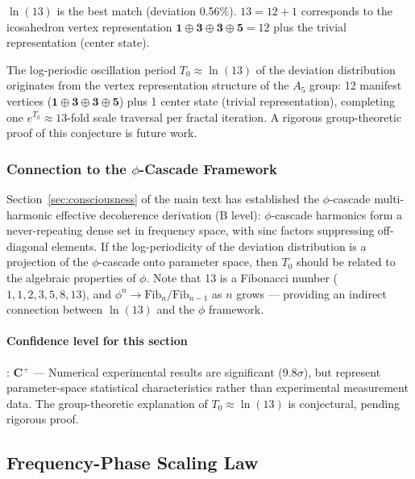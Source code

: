 $\ln(13)$ is the best match (deviation 0.56\%). $13 = 12 + 1$ corresponds to the icosahedron vertex representation $\mathbf{1}\oplus\mathbf{3}\oplus\mathbf{3}\oplus\mathbf{5} = 12$ plus the trivial representation (center state).

\begin{conjecture}
\label{conj:ln13_en}
The log-periodic oscillation period $T_0 \approx \ln(13)$ of the deviation distribution originates from the vertex representation structure of the $A_5$ group: 12 manifest vertices ($\mathbf{1}\oplus\mathbf{3}\oplus\mathbf{3}\oplus\mathbf{5}$) plus 1 center state (trivial representation), completing one $e^{T_0}\approx 13$-fold scale traversal per fractal iteration. A rigorous group-theoretic proof of this conjecture is future work.
\end{conjecture}

\subsubsection{Connection to the $\phi$-Cascade Framework}

Section~\ref{sec:consciousness} of the main text has established the $\phi$-cascade multi-harmonic effective decoherence derivation (B level): $\phi$-cascade harmonics form a never-repeating dense set in frequency space, with sinc factors suppressing off-diagonal elements. If the log-periodicity of the deviation distribution is a projection of the $\phi$-cascade onto parameter space, then $T_0$ should be related to the algebraic properties of $\phi$. Note that 13 is a Fibonacci number ($1,1,2,3,5,8,13$), and $\phi^n \to \text{Fib}_n/\text{Fib}_{n-1}$ as $n$ grows --- providing an indirect connection between $\ln(13)$ and the $\phi$ framework.

\paragraph{Confidence level for this section}: \textbf{C$^+$} --- Numerical experimental results are significant ($9.8\sigma$), but represent parameter-space statistical characteristics rather than experimental measurement data. The group-theoretic explanation of $T_0 \approx \ln(13)$ is conjectural, pending rigorous proof.

\subsection{Frequency-Phase Scaling Law}
\label{subsec:freq_phase}

